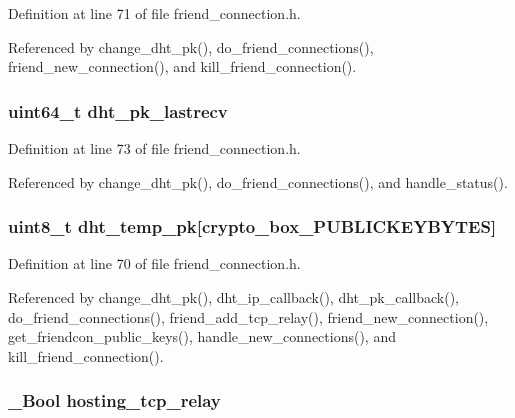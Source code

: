 Definition at line 71 of file friend\+\_\+connection.\+h.



Referenced by change\+\_\+dht\+\_\+pk(), do\+\_\+friend\+\_\+connections(), friend\+\_\+new\+\_\+connection(), and kill\+\_\+friend\+\_\+connection().

\hypertarget{struct_friend___conn_a64eb95337c42cb30956ee42f7c42cf0e}{
\subsubsection[{dht\+\_\+pk\+\_\+lastrecv}]{\setlength{\rightskip}{0pt plus 5cm}uint64\+\_\+t dht\+\_\+pk\+\_\+lastrecv}}\label{struct_friend___conn_a64eb95337c42cb30956ee42f7c42cf0e}


Definition at line 73 of file friend\+\_\+connection.\+h.



Referenced by change\+\_\+dht\+\_\+pk(), do\+\_\+friend\+\_\+connections(), and handle\+\_\+status().

\hypertarget{struct_friend___conn_ab863a4d1023acff25635c1b4a36015a2}{
\subsubsection[{dht\+\_\+temp\+\_\+pk}]{\setlength{\rightskip}{0pt plus 5cm}uint8\+\_\+t dht\+\_\+temp\+\_\+pk\mbox{[}crypto\+\_\+box\+\_\+\+P\+U\+B\+L\+I\+C\+K\+E\+Y\+B\+Y\+T\+E\+S\mbox{]}}}\label{struct_friend___conn_ab863a4d1023acff25635c1b4a36015a2}


Definition at line 70 of file friend\+\_\+connection.\+h.



Referenced by change\+\_\+dht\+\_\+pk(), dht\+\_\+ip\+\_\+callback(), dht\+\_\+pk\+\_\+callback(), do\+\_\+friend\+\_\+connections(), friend\+\_\+add\+\_\+tcp\+\_\+relay(), friend\+\_\+new\+\_\+connection(), get\+\_\+friendcon\+\_\+public\+\_\+keys(), handle\+\_\+new\+\_\+connections(), and kill\+\_\+friend\+\_\+connection().

\hypertarget{struct_friend___conn_a4865ba9009fdee84e62a08fb92a59ab5}{
\subsubsection[{hosting\+\_\+tcp\+\_\+relay}]{\setlength{\rightskip}{0pt plus 5cm}\+\_\+\+Bool hosting\+\_\+tcp\+\_\+relay}}\label{struct_friend___conn_a4865ba9009fdee84e62a08fb92a59ab5}


